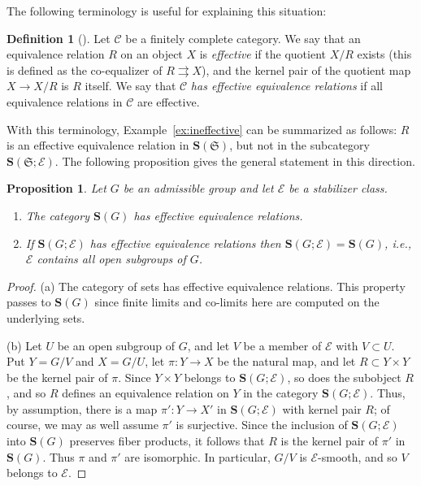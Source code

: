 \documentclass[12pt]{amsart}
\numberwithin{equation}{section}
\newtheorem{proposition}[equation]{Proposition}
\theoremstyle{definition}
\newtheorem{defnaux}[equation]{Definition}
\newenvironment{definition}[1][]{\begin{defnaux}[#1]\pushQED{\qed}}{\popQED \end{defnaux}}
\newcommand{\cC}{\mathcal{C}}
\newcommand{\sE}{\mathscr{E}}
\newcommand{\bS}{\mathbf{S}}
\newcommand{\fS}{\mathfrak{S}}
\newcommand{\defn}[1]{\emph{#1}}
\begin{document}
The following terminology is useful for explaining this situation:

\begin{definition} \label{defn:eff-eq}
Let $\cC$ be a finitely complete category. We say that an equivalence relation $R$ on an object $X$ is \defn{effective} if the quotient $X/R$ exists (this is defined as the co-equalizer of $R \rightrightarrows X$), and the kernel pair of the quotient map $X \to X/R$ is $R$ itself. We say that $\cC$ \defn{has effective equivalence relations} if all equivalence relations in $\cC$ are effective.
\end{definition}

With this terminology, Example~\ref{ex:ineffective} can be summarized as follows: $R$ is an effective equivalence relation in $\bS(\fS)$, but not in the subcategory $\bS(\fS; \sE)$. The following proposition gives the general statement in this direction.

\begin{proposition} \label{prop:ad-eff-eq}
Let $G$ be an admissible group and let $\sE$ be a stabilizer class.
\begin{enumerate}
\item The category $\bS(G)$ has effective equivalence relations.
\item If $\bS(G; \sE)$ has effective equivalence relations then $\bS(G; \sE)=\bS(G)$, i.e., $\sE$ contains all open subgroups of $G$.
\end{enumerate}
\end{proposition}

\begin{proof}
(a) The category of sets has effective equivalence relations. This property passes to $\bS(G)$ since finite limits and co-limits here are computed on the underlying sets.

(b) Let $U$ be an open subgroup of $G$, and let $V$ be a member of $\sE$ with $V \subset U$. Put $Y=G/V$ and $X=G/U$, let $\pi \colon Y \to X$ be the natural map, and let $R \subset Y \times Y$ be the kernel pair of $\pi$. Since $Y \times Y$ belongs to $\bS(G;\sE)$, so does the subobject $R$, and so $R$ defines an equivalence relation on $Y$ in the category $\bS(G;\sE)$. Thus, by assumption, there is a map $\pi' \colon Y \to X'$ in $\bS(G;\sE)$ with kernel pair $R$; of course, we may as well assume $\pi'$ is surjective. Since the inclusion of $\bS(G;\sE)$ into $\bS(G)$ preserves fiber products, it follows that $R$ is the kernel pair of $\pi'$ in $\bS(G)$. Thus $\pi$ and $\pi'$ are isomorphic. In particular, $G/V$ is $\sE$-smooth, and so $V$ belongs to $\sE$.
\end{proof}
\end{document}
